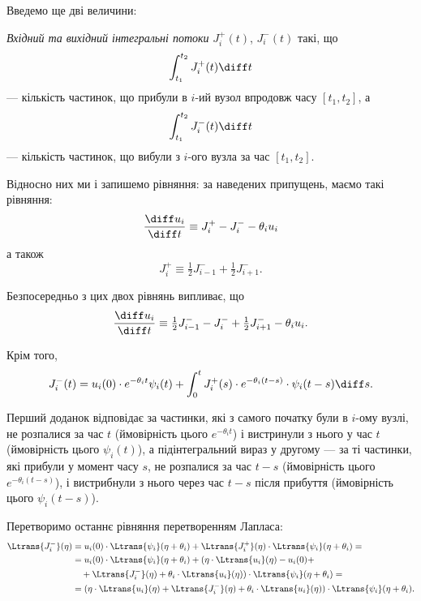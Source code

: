 Введемо ще дві величини: 
\begin{definition}
    \textit{Вхідний та вихідний інтегральні потоки} $J_i^+(t)$, $J_i^-(t)$ такі, що
    \begin{equation}
        \int_{t_1}^{t_2} J_i^+(t) \diff t
    \end{equation}
    --- кількість частинок, що прибули в $i$-ий вузол впродовж часу $[t_1, t_2]$, а
    \begin{equation}
        \int_{t_1}^{t_2} J_i^-(t) \diff t
    \end{equation}
    --- кількість частинок, що вибули з $i$-ого вузла за час $[t_1, t_2]$.
\end{definition}

Відносно них ми і запишемо рівняння: за наведених припущень, маємо такі рівняння:
\begin{equation}
    \frac{\diff u_i}{\diff t} \equiv J_i^+ - J_i^- - \theta_i u_i
\end{equation}
а також
\begin{equation}
    J_i^+ \equiv \tfrac{1}{2} J_{i - 1}^- + \tfrac{1}{2} J_{i + 1}^-.
\end{equation}

Безпосередньо з цих двох рівнянь випливає, що
\begin{equation}
    \frac{\diff u_i}{\diff t} \equiv \tfrac{1}{2} J_{i - 1}^- - J_i^- + \tfrac{1}{2} J_{i + 1}^- - \theta_i u_i.
\end{equation}

Крім того,
\begin{equation}
    J_i^-(t) = u_i(0) \cdot e^{-\theta_i t} \psi_i(t) + \int_0^t J_i^+(s) \cdot e^{-\theta_i (t - s)} \cdot \psi_i(t - s) \diff s.
\end{equation}

Перший доданок відповідає за частинки, які з самого початку були в $i$-ому вузлі, не розпалися за час $t$ (ймовірність цього $e^{-\theta_i t}$) і вистринули з нього у час $t$ (ймовірність цього $\psi_i(t)$), а підінтегральний вираз у другому --- за  ті частинки, які прибули у момент часу $s$, не розпалися за час $t - s$ (ймовірність цього $e^{-\theta_i (t - s)}$), і вистрибнули з нього через час $t - s$ після прибуття (ймовірність цього $\psi_i(t - s)$). \medskip

Перетворимо останнє рівняння перетворенням Лапласа:
\begin{equation}
    \begin{aligned}
        \Ltrans{J_i^-}(\eta)
        &= u_i(0) \cdot \Ltrans{\psi_i}(\eta + \theta_i) + \Ltrans{J_i^+}(\eta) \cdot \Ltrans{\psi_i}(\eta + \theta_i) = \\
        &= u_i(0) \cdot \Ltrans{\psi_i}(\eta + \theta_i) + ( \eta \cdot \Ltrans{u_i}(\eta) - u_i(0) + \\
        &\quad + \Ltrans{J_i^-}(\eta) + \theta_i \cdot \Ltrans{u_i}(\eta) ) \cdot \Ltrans{\psi_i}(\eta + \theta_i) = \\
        &= ( \eta \cdot \Ltrans{u_i}(\eta) + \Ltrans{J_i^-}(\eta) + \theta_i \cdot \Ltrans{u_i}(\eta) ) \cdot \Ltrans{\psi_i}(\eta + \theta_i).
    \end{aligned}
\end{equation}

